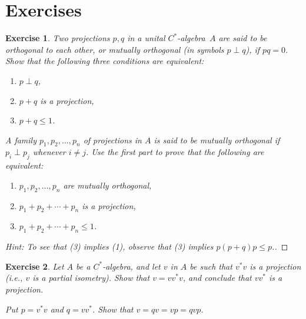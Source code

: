 \documentclass{book}
\newtheorem{exercise}{Exercise}[section]
\def\cstar{\(C^*\)-algebra}
\begin{document}
\section{Exercises}
\begin{exercise}\label{ex:24}
  Two projections \(p, q\) in a unital \cstar\ \(A\) are said to be \textnormal{orthogonal to each other},
  or mutually orthogonal (in symbols \(p\perp q\)), if \(pq=0\).\\
  Show that the following three conditions are equivalent:
  \begin{enumerate}
    \item \(p\perp q\),
    \item \(p+q\) is a projection,
    \item \(p+q\leq 1\).
  \end{enumerate}
  A family \(p_1, p_2,\ldots,p_n\) of projections in \(A\) is said to be mutually orthogonal if 
  \(p_i\perp p_j\) whenever \(i\neq j\). Use the first part to prove that the following are equivalent:
  \begin{enumerate}
    \item \(p_1, p_2,\ldots,p_n\) are mutually orthogonal,
    \item \(p_1+p_2+\cdots +p_n\) is a projection,
    \item \(p_1+p_2+\cdots+p_n\leq 1\).
  \end{enumerate}
\end{exercise}
\begin{proof}
  [Hint: To see that (3) implies (1), observe that (3) implies \(p(p+q)p\leq p\).]
\end{proof}
\begin{exercise}\label{ex:25}
  Let \(A\) be a \cstar, and let \(v\) in \(A\) be such that \(v^* v\) is a projection (i.e., \(v\) is a partial isometry).
  Show that \(v=v v^*v\), and conclude that \(v v^*\) is a projection.\par
  Put \(p=v^* v\) and \(q=v v^*\). Show that \(v=qv=vp=qvp\). 
\end{exercise}
\end{document}
